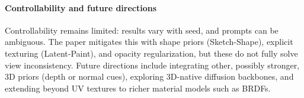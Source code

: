 \begin{enrichment}
\begin{enrichment}
        \paragraph{Controllability and future directions}
        Controllability remains limited: results vary with seed, and prompts can be ambiguous. The paper mitigates this with shape priors (Sketch-Shape), explicit texturing (Latent-Paint), and opacity regularization, but these do not fully solve view inconsistency. Future directions include integrating other, possibly stronger, 3D priors (depth or normal cues), exploring 3D-native diffusion backbones, and extending beyond UV textures to richer material models such as BRDFs.
    
    \end{enrichment}
    
\end{enrichment}
